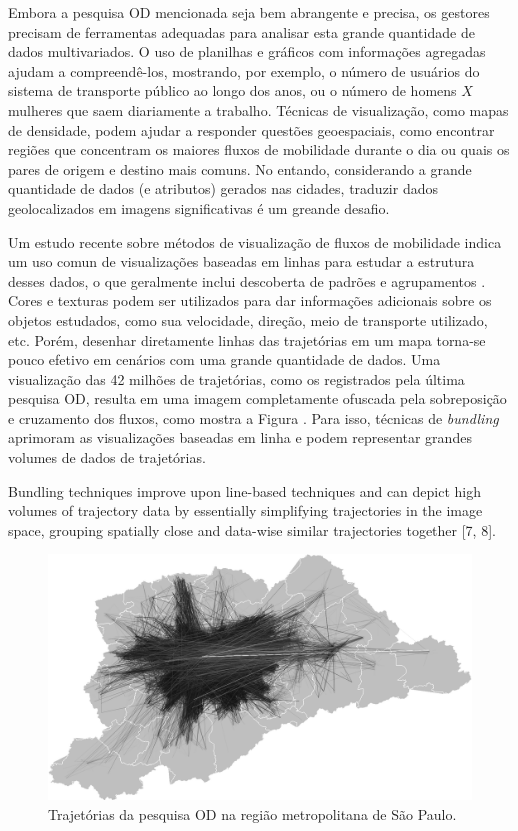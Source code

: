 Embora a pesquisa OD mencionada seja bem abrangente e precisa, 
os gestores precisam de ferramentas adequadas para analisar esta grande quantidade de
dados multivariados. O uso de planilhas e gráficos com informações agregadas
ajudam a compreendê-los, mostrando, por exemplo, o número de usuários 
do sistema de transporte público ao longo dos anos, ou o número de homens ${X}$ mulheres
que saem diariamente a trabalho. Técnicas de visualização, como mapas de densidade,
podem ajudar a responder questões geoespaciais, como encontrar regiões que concentram
os maiores fluxos de mobilidade durante o dia ou quais os pares de origem e destino
mais comuns. No entando, considerando a grande quantidade de dados (e atributos) gerados
nas cidades, traduzir dados geolocalizados em imagens significativas é um greande desafio.

Um estudo recente sobre métodos de visualização de fluxos de mobilidade indica um
uso comun de visualizações baseadas em linhas para estudar a estrutura desses dados,
o que geralmente inclui descoberta de padrões e agrupamentos \cite{Chen2015}. Cores e texturas
podem ser utilizados para dar informações adicionais sobre os objetos estudados, como sua velocidade, direção,
meio de transporte utilizado, etc. Porém, desenhar diretamente linhas das trajetórias em um mapa
torna-se pouco efetivo em cenários com uma grande quantidade de dados. Uma visualização das 42 milhões de trajetórias,
como os registrados pela última pesquisa OD, resulta em uma imagem completamente ofuscada
pela sobreposição e cruzamento dos fluxos, como mostra a Figura \cite{fig:cluttered-graph}.
Para isso, técnicas de \emph{bundling} aprimoram as visualizações baseadas em linha e podem
representar grandes volumes de dados de trajetórias.

Bundling techniques improve upon line-based techniques and can
depict high volumes of trajectory data by essentially simplifying trajectories in the
image space, grouping spatially close and data-wise similar trajectories together [7,
8].


\begin{figure}[!htb]
  \centering
  \includegraphics[width=150mm]{../figuras/unbundled-edges+grayscale+512px.png}
  \caption[Trajetórias da pesquisa OD na região metropolitana de S\~ao Paulo]{Trajetórias da pesquisa
OD na região metropolitana de S\~ao Paulo. \label{fig:cluttered-graph}}

\end{figure}

